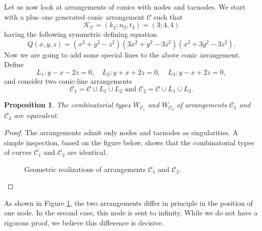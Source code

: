 \documentclass[11pt]{article}
\theoremstyle{plain}
\newtheorem{proposition}[thm]{Proposition}
\theoremstyle{definition}
\begin{document}
Let us now look at arrangements of conics with nodes and tacnodes. We start with a plus--one generated conic arrangement $\mathcal{C}$ such that
$$\mathcal{K}_{\mathcal{C}} = (k_{2};n_{2},t_{3}) = (3;4,4)$$
having the following symmetric defining equation
$$Q(x,y,z) = (x^2 + y^{2} - z^{2})(3x^{2}+y^{2}-3z^{2})(x^{2}+3y^{2}-3z^{2}).$$
Now we are going to add some special lines to the above conic arrangement. Define
$$L_{1} : y-x-2z=0, \quad L_{2} : y+x+2z = 0, \quad L_{3} : y-x+2z=0,$$
and consider two conic-line arrangements
$$\mathcal{C}_{1} = \mathcal{C} \cup L_{1} \cup L_{2} \text{ and } \mathcal{C}_{2} = \mathcal{C} \cup L_{1} \cup L_{3}.$$
 
\begin{proposition}
The combinatorial types $W_{\mathcal{C}_{1}}$ and $W_{\mathcal{C}_{2}}$ of arrangements $\mathcal{C}_{1}$ and $\mathcal{C}_{2}$ are equivalent.
\end{proposition}
\begin{proof}
The arrangements admit only nodes and tacnodes as singularities. A simple inspection, based on the figure below, shows that the combinatorial types of curves $\mathcal{C}_{1}$ and $\mathcal{C}_{2}$ are identical. 
\vskip0.5cm
\begin{figure}[h!]
\begin{minipage}{0.45\textwidth}
\centering
\end{minipage} 
\hfill
\begin{minipage}{0.45\textwidth}
\centering
{}
\end{minipage}
\label{gr}
\caption{Geometric realizations of arrangements $\mathcal{C}_{1}$ and $\mathcal{C}_{2}$.}
\end{figure}
\end{proof}
As shown in Figure \ref{gr}, the two arrangements differ in principle in the position of one node. In the second case, this node is sent to infinity. While we do not have a rigorous proof, we believe this difference is decisive.
\end{document}
